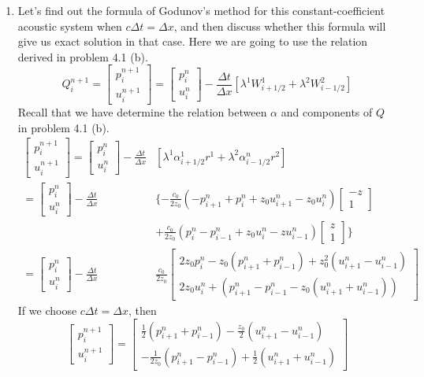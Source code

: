 \documentclass[11pt]{article}
\begin{document}
\begin{enumerate}
\begin{enumerate}
				\item
					Let's find out the formula of Godunov's method for this constant-coefficient acoustic system when $c\Delta t=\Delta x$, and then discuss whether this formula will give us exact solution in that case. Here we are going to use the relation derived in problem 4.1 (b).
					\[
					Q_i^{n+1}=\begin{bmatrix}p_i^{n+1}\\u_i^{n+1}\end{bmatrix}
					=\begin{bmatrix}p_i^n\\u_i^n\end{bmatrix}-\frac{\Delta t}{\Delta x}
					[\lambda^1 W_{i+1/2}^1 + \lambda^2W_{i-1/2}^2]
					\]
					Recall that we have determine the relation between $\alpha$ and components of $Q$ in problem 4.1 (b).
					\begin{align*}
					\begin{bmatrix}p_i^{n+1}\\u_i^{n+1}\end{bmatrix} = 
					\begin{bmatrix}p_i^n\\u_i^n\end{bmatrix}-\frac{\Delta t}{\Delta x}
					&[\lambda^1 \alpha_{i+1/2}^1 r^1 + \lambda^2\alpha_{i-1/2}^nr^2]\\
					=\begin{bmatrix}p_i^n\\u_i^n\end{bmatrix}-\frac{\Delta t}{\Delta x}
					&\{-\frac{c_0}{2z_0}(-p_{i+1}^n+p_i^n+z_0u_{i+1}^n-z_0u_i^n)
					\begin{bmatrix}-z\\1\end{bmatrix} \\
					& +\frac{c_0}{2z_0}(p_i^n-p_{i-1}^n+z_0u_i^n-zu_{i-1}^n)
					\begin{bmatrix}z\\1\end{bmatrix}\}\\
					=\begin{bmatrix}p_i^n\\u_i^n\end{bmatrix}-\frac{\Delta t}{\Delta x}
					&\frac{c_0}{2z_0}\begin{bmatrix}2z_0p_i^n-z_0(p_{i+1}^n+p_{i-1}^n)+z_0^2(u_{i+1}^n-u_{i-1}^n)\\
					2z_0u_i^n+(p_{i+1}^n-p_{i-1}^n-z_0(u_{i+1}^n+u_{i-1}^n))
					\end{bmatrix}
					\end{align*}
					If we choose $c\Delta t=\Delta x$, then
					\[
					\begin{bmatrix}p_i^{n+1}\\u_i^{n+1}\end{bmatrix} = \begin{bmatrix}
					\frac{1}{2}(p_{i+1}^n+p_{i-1}^n)-\frac{z_0}{2}(u_{i+1}^n-u_{i-1}^n)\\
					-\frac{1}{2z_0}(p_{i+1}^n-p_{i-1}^n)+\frac{1}{2}(u_{i+1}^n+u_{i-1}^n)
					\end{bmatrix}
					\]
					

\end{enumerate}
\end{enumerate}
\end{document}
